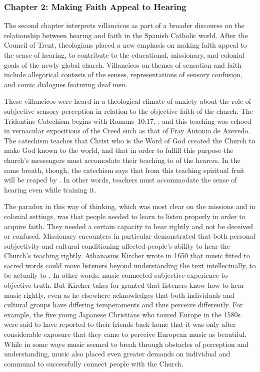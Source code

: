 \documentclass[tt]{vcbook-proposal}
\begin{document}
\subsubsection{Chapter 2: Making Faith Appeal to Hearing}

The second chapter interprets villancicos as part of a broader discourse on the relationship between hearing and faith in the Spanish Catholic world.
After the Council of Trent, theologians placed a new emphasis on making faith appeal to the sense of hearing, to contribute to the educational, missionary, and colonial goals of the newly global church.
Villancicos on themes of sensation and faith include allegorical contests of the senses, representations of sensory confusion, and comic dialogues featuring deaf men.

These villancicos were heard in a theological climate of anxiety about the role of subjective sensory perception in relation to the objective faith of the church.
The Tridentine Catechism begins with Romans~10:17, ; and this teaching was echoed in vernacular expositions of the Creed such as that of Fray Antonio de Azevedo.
The catechism teaches that Christ who is the Word of God created the Church to make God known to the world, and that in order to fulfill this purpose the church's messengers must accomodate their teaching to  of the hearers.
In the same breath, though, the catechism says that from this teaching spiritual fruit will be reaped by .
In other words, teachers must accommodate the sense of hearing even while training it.

The paradox in this way of thinking, which was most clear on the missions and in colonial settings, was that people needed to learn to listen properly in order to acquire faith.
They needed a certain capacity to hear rightly and not be deceived or confused.
Missionary encounters in particular demonstrated that both personal subjectivity and cultural conditioning affected people's ability to hear the Church's teaching rightly.
Athanasius Kircher wrote in 1650 that music fitted to sacred words could move listeners beyond understanding the text intellectually, to be actually  to .
In other words, music connected subjective experience to objective truth. 
But Kircher takes for granted that listeners know how to hear music rightly, even as he elsewhere acknowledges that both individuals and cultural groups have differing temperaments and thus perceive differently.
For example, the five young Japanese Christians who toured Europe in the 1580s were said to have reported to their friends back home that it was only after considerable exposure that they came to perceive European music as beautiful.
While in some ways music seemed to break through obstacles of perception and understanding, music also placed even greater demands on individual and communal  to successfully connect people with the Church.
\end{document}
